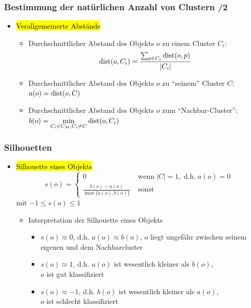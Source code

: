 
\begin{frame}
\frametitle{Bestimmung der natürlichen Anzahl von Clustern /2}

\begin{itemize}
\item \hl{Verallgemeinerte Abstände}
\begin{itemize}
\item Durchschnittlicher Abstand des Objekts $o$ zu einem Cluster
  $C_i$:  
$$\operatorname{dist}(o,C_i)=\frac{\sum_{p\in C_i}\operatorname{dist}(o,p)}{|C_i|}$$
\item Durchschnittlicher Abstand des Objekts $o$ zu "`seinem"' Cluster
  $C$: $a(o) = \operatorname{dist}(o,C)$ 
\item Durchschnittlicher Abstand des Objekts $o$ zum "`Nachbar-Cluster"': 
$b(o)=\displaystyle\min_{C_i \in C_M, C_i\neq C} \operatorname{dist}(o, C_i)$
\end{itemize}
\end{itemize}

\end{frame}


\begin{frame}
\frametitle{Silhouetten}

\begin{itemize}
\item \hl{Silhouette eines Objekts}
$$
s(o)=
\begin{cases}
0 & \text{wenn}\;|C|=1,\;\text{d.h.}\;a(o)=0 \\
\frac{b(o)-a(o)}{\max\{a(o),b(o)\}}\;&\text{sonst}
\end{cases}
$$
 mit $-1 \leq s(o) \leq 1$ 
\begin{itemize}
\item Interpretation der Silhouette eines Objekts 
\begin{itemize}
\item $s(o) \approx 0$, d.h. $a(o)\approx b(o)$, $o$ liegt ungefähr
  zwischen seinem eigenen und dem Nachbarcluster  
\item $s(o) \approx 1$, d.h. $a(o)$ ist wesentlich kleiner als $b(o)$,\\
  $o$ ist gut klassifiziert  
\item $s(o) \approx -1$, d.h. $b(o)$ ist wesentlich kleiner als
  $a(o)$,\\ $o$ ist schlecht klassifiziert  
\end{itemize}
\end{itemize}
\end{itemize}
\end{frame}

